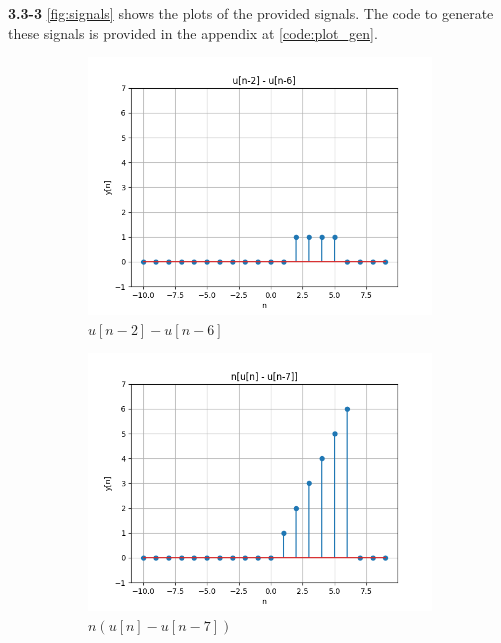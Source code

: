 \documentclass{article}
\begin{document}
\textbf{3.3-3}
\autoref{fig:signals} shows the plots of the provided signals. The code to generate these signals is provided in the appendix at \autoref{code:plot_gen}.
\begin{figure}[ht!]
    \centering
    \begin{subfigure}[b]{0.3\textwidth}
        \includegraphics[width=\textwidth]{plot1.png}
        \caption{$u[n-2]-u[n-6]$}
    \end{subfigure}
    \begin{subfigure}[b]{0.3\textwidth}
        \includegraphics[width=\textwidth]{plot2.png}
        \caption{$n(u[n]-u[n-7])$}
    \end{subfigure}
    \begin{subfigure}[b]{0.3\textwidth}

\end{subfigure}
\end{figure}
\end{document}
